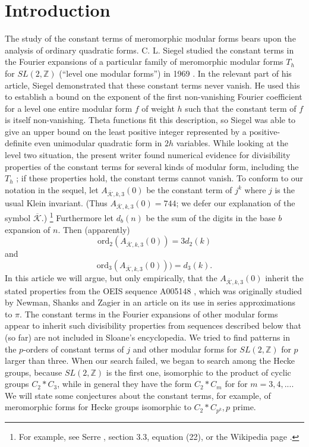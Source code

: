 \documentclass{article}
\begin{document}
\section{Introduction}
The study of the 
constant terms of meromorphic modular forms
bears upon the analysis  of ordinary 
quadratic forms.
C. L. Siegel studied the constant terms in the
Fourier expansions of a particular family 
of meromorphic modular forms $T_h$ for
$SL(2,\mathbb{Z})$ (``level one modular forms'') 
in 1969
\cite{siegel1969berechnung, siegel1980evaluation}.
In the relevant 
part of his article, Siegel
demonstrated that these constant terms never vanish.
He used this to 
establish a bound on 
the exponent of the first non-vanishing Fourier 
coefficient for
a level one entire modular form $f$ of weight 
$h$ such that the
constant term of $f$ is itself non-vanishing. 
Theta 
functions fit this description, so Siegel 
was able to give an upper 
bound on the least positive integer 
represented by a positive-definite
even unimodular quadratic form in $2h$ variables.
\newline \newline \noindent
While looking at the level two situation,
the present writer found 
numerical evidence for
divisibility properties of the constant terms 
for several kinds of modular form, including 
the $T_h$ \cite{brent1998quadratic}; 
if these properties hold, the constant terms 
cannot vanish. 
To conform to our notation in the sequel,
let $A_{\overline{\mathcal{K}},k,3}(0)$ 
be the constant
term of $j^k$ where $j$ is the usual  
Klein invariant. 
(Thus $A_{\overline{\mathcal{K}},k,3}(0) = 744$;
we defer our explanation of the symbol 
$\overline{\mathcal{K}}$.)
\footnote{For example, see Serre \cite{serre1970course}, 
section 3.3, equation (22), or the Wikipedia page
\cite{jWiki}.}
Furthermore let $d_b(n)$ be the sum of the digits in 
the base $b$
expansion of $n$. Then (apparently) 
$$\text{ord}_2(A_{\overline{\mathcal{K}},k,3}(0)) 
= 3d_2(k)$$
and $$\text{ord}_3(A_{\overline{\mathcal{K}},k,3}(0))) = 
d_3(k).$$ 
In this 
article we will argue, but only
empirically, that the $A_{\overline{\mathcal{K}},k,3}(0)$ 
inherit the stated properties from the 
OEIS sequence A005148 \cite{OEISNewmanShanks},
which was originally studied by Newman, Shanks
and Zagier
\cite{newman2004sequence, 
newman2004sequenceAppendix}
in an article on its use in series 
approximations to $\pi$. The constant terms
in the Fourier expansions of other modular
forms appear to inherit such divisibility 
properties from sequences described below
that (so far) are not included in 
Sloane's encyclopedia.
\newline \newline \noindent
We tried 
to find patterns in the
$p$-orders of constant terms of 
$j$ and other modular forms for
$SL(2,\mathbb{Z})$ for $p$ larger than three.
When our search failed, we 
began to search among the  Hecke groups,
because $SL(2,\mathbb{Z})$ is the first one, 
isomorphic to the product of
cyclic groups $C_2*C_3$,
while in general they 
have the form $C_2*C_m$ for 
for $m = 3, 4, ....$
We will state some conjectures
about the constant terms, for example, of
meromorphic forms for
Hecke groups isomorphic to $C_2*C_{p^k}, p$
prime.
\end{document}
